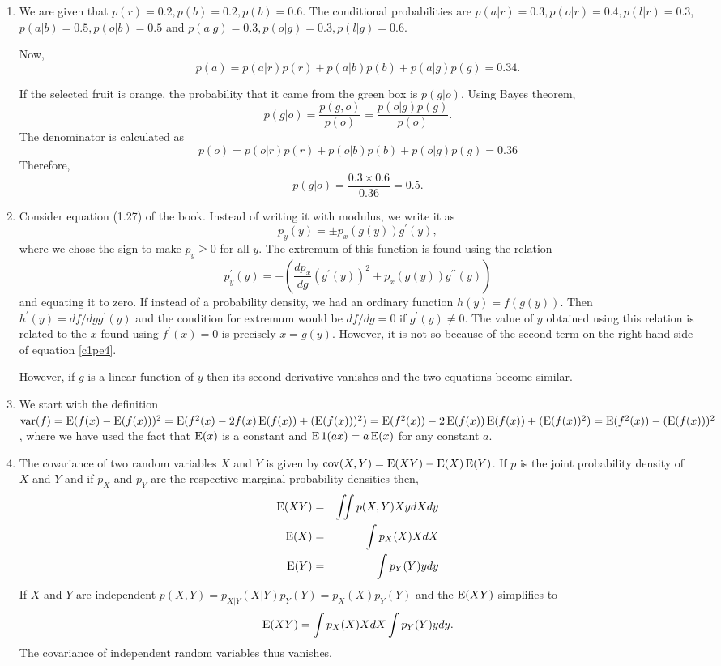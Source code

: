 \begin{enumerate}
\item We are given that $p(r) = 0.2, p(b) = 0.2, p(b) = 0.6$. The conditional probabilities are
$p(a|r) = 0.3, p(o|r) = 0.4, p(l|r) = 0.3$, $p(a|b) = 0.5, p(o|b) = 0.5$ and $p(a|g) = 0.3, p(o|g)
= 0.3, p(l|g) = 0.6$.

Now, 
\[
p(a) = p(a|r)p(r) + p(a|b)p(b) + p(a|g)p(g) = 0.34.
\]

If the selected fruit is orange, the probability that it came from the green box is $p(g|o)$. Using
Bayes theorem,
\[
p(g|o) = \frac{p(g, o)}{p(o)} = \frac{p(o|g)p(g)}{p(o)}.
\]
The denominator is calculated as
\[
p(o) = p(o|r)p(r) + p(o|b)p(b) + p(o|g)p(g) = 0.36
\]
Therefore,
\[
p(g|o) = \frac{0.3 \times 0.6}{0.36} = 0.5.
\]

\item Consider equation (1.27) of the book. Instead of writing it with modulus, we write it as
\[
p_y(y) = \pm p_x(g(y))g^\prime(y),
\]
where we chose the sign to make $p_y \ge 0$ for all $y$. The extremum of this function is found
using the relation
\begin{equation}\label{c1pe4}
p_y^\prime(y) = \pm\left(\frac{dp_x}{dg}\left(g^\prime(y)\right)^2 + p_x(g(y))g^{\prime\prime}(y)\right)
\end{equation}
and equating it to zero. If instead of a probability density, we had an ordinary
function $h(y) = f(g(y))$. Then $h^\prime(y) = df/dg g^\prime(y)$ and the condition for extremum
would be $df/dg = 0$ if $g^\prime(y) \ne 0$. The value of $y$ obtained using this relation
is related to the $x$ found using $f^\prime(x) = 0$ is precisely $x = g(y)$. However, it
is not so because of the second term on the right hand side of equation \eqref{c1pe4}.

However, if $g$ is a linear function of $y$ then its second derivative vanishes and the two
equations become similar.

\item We start with the definition $\operatorname{var}(f) = \operatorname{E}(f(x) - \operatorname{E}(f(x)))^2 = \operatorname{E}(f^2(x) - 2f(x)\operatorname{E}(f(x)) + (\operatorname{E}(f(x)))^2)
= \operatorname{E}(f^2(x)) - 2\operatorname{E}(f(x))\operatorname{E}(f(x)) + (\operatorname{E}(f(x))^2) = \operatorname{E}(f^2(x)) - (\operatorname{E}(f(x)))^2$, where we 
have used the fact that $\operatorname{E}(x)$ is a constant and $\operatorname{E}1(ax) = a\operatorname{E}(x)$ for any constant $a$.

\item The covariance of two random variables $X$ and $Y$ is given by $\operatorname{cov}(X, Y) = \operatorname{E}(XY) - \operatorname{E}(X)\operatorname{E}(Y)$.
If $p$ is the joint probability density of $X$ and $Y$ and if $p_X$ and $p_Y$ are the respective marginal 
probability densities then,
\begin{eqnarray*}
\operatorname{E}(XY) &=& \iint p(X, Y)Xy dXdy \\
\operatorname{E}(X)  &=& \int p_X(X) X dX \\
\operatorname{E}(Y)  &=& \int p_Y(Y) y dy
\end{eqnarray*}
If $X$ and $Y$ are independent $p(X, Y) = p_{X|Y}(X|Y)p_Y(Y) = p_X(X)p_Y(Y)$ and the $\operatorname{E}(XY)$ simplifies
to
\[
\operatorname{E}(XY) = \int p_X(X)XdX \int p_Y(Y)ydy.
\]
The covariance of independent random variables thus vanishes.


\end{enumerate}

